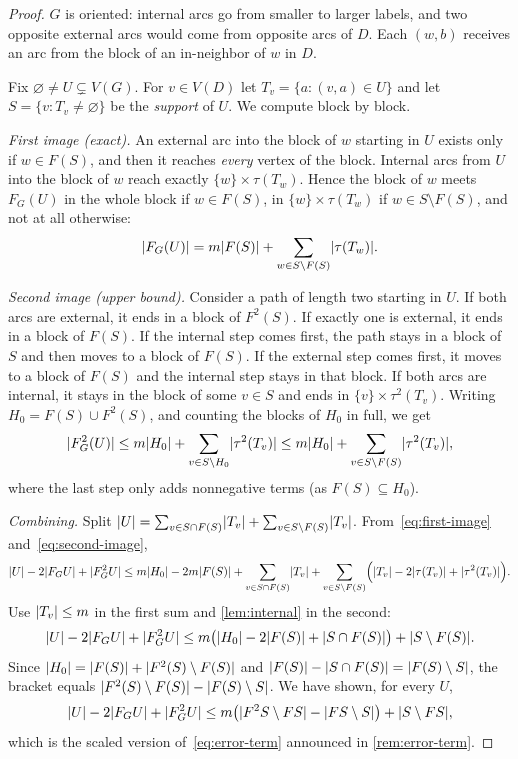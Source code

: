 \begin{proof}
$G$ is oriented: internal arcs go from smaller to larger labels, and two
opposite external arcs would come from opposite arcs of $D$. Each $(w,b)$
receives an arc from the block of an in-neighbor of $w$ in $D$.

Fix $\varnothing\ne U\subsetneq V(G)$. For $v\in V(D)$ let
$T_v=\{a:(v,a)\in U\}$ and let $S=\{v:T_v\ne\varnothing\}$ be the
\emph{support} of $U$. We compute block by block.

\emph{First image (exact).} An external arc into the block of $w$ starting
in $U$ exists only if $w\in F(S)$, and then it reaches \emph{every} vertex of
the block. Internal arcs from $U$ into the block of $w$ reach exactly
$\{w\}\times \tau(T_w)$. Hence the block of $w$ meets $F_G(U)$ in the whole block
if $w\in F(S)$, in $\{w\}\times \tau(T_w)$ if $w\in S\setminus F(S)$, and not at all
otherwise:
\begin{equation}\label{eq:first-image}
 \lvert F_G(U)\rvert=m\lvert F(S)\rvert+\sum_{w\in S\setminus F(S)}\lvert \tau(T_w)\rvert.
\end{equation}

\emph{Second image (upper bound).} Consider a path of length two starting in
$U$. If both arcs are external, it ends in a block of $F^2(S)$. If exactly
one is external, it ends in a block of $F(S)$. If the internal step comes
first, the path stays in a block of $S$ and then moves to a block of $F(S)$.
If the external step comes first, it moves to a block of $F(S)$ and the
internal step stays in that block. If
both arcs are internal, it stays in the block of some $v\in S$ and ends in
$\{v\}\times \tau^2(T_v)$. Writing $H_0=F(S)\cup F^2(S)$, and counting the blocks
of $H_0$ in full, we get
\begin{equation}\label{eq:second-image}
 \lvert F_G^2(U)\rvert\le m\lvert H_0\rvert+\sum_{v\in S\setminus H_0}\lvert \tau^2(T_v)\rvert
 \le m\lvert H_0\rvert+\sum_{v\in S\setminus F(S)}\lvert \tau^2(T_v)\rvert,
\end{equation}
where the last step only adds nonnegative terms (as $F(S)\subseteq H_0$).

\emph{Combining.} Split $\lvert U\rvert=\sum_{v\in S\cap F(S)}\lvert T_v\rvert+\sum_{v\in S\setminus F(S)}\lvert T_v\rvert$.
From~\eqref{eq:first-image} and~\eqref{eq:second-image},
\[
 \lvert U\rvert-2\lvert F_GU\rvert+\lvert F_G^2U\rvert
 \le m\lvert H_0\rvert-2m\lvert F(S)\rvert+\sum_{v\in S\cap F(S)}\lvert T_v\rvert
 +\sum_{v\in S\setminus F(S)}\Bigl(\lvert T_v\rvert-2\lvert \tau(T_v)\rvert+\lvert \tau^2(T_v)\rvert\Bigr).
\]
Use $\lvert T_v\rvert\le m$ in the first sum and \cref{lem:internal} in the second:
\[
 \lvert U\rvert-2\lvert F_GU\rvert+\lvert F_G^2U\rvert\le m\bigl(\lvert H_0\rvert-2\lvert F(S)\rvert+\lvert S\cap F(S)\rvert\bigr)+\lvert S\setminus F(S)\rvert.
\]
Since $\lvert H_0\rvert=\lvert F(S)\rvert+\lvert F^2(S)\setminus F(S)\rvert$ and
$\lvert F(S)\rvert-\lvert S\cap F(S)\rvert=\lvert F(S)\setminus S\rvert$, the bracket equals
$\lvert F^2(S)\setminus F(S)\rvert-\lvert F(S)\setminus S\rvert$. We have shown, for every
$U$,
\begin{equation}\label{eq:blowup-master}
 \lvert U\rvert-2\lvert F_GU\rvert+\lvert F_G^2U\rvert\le m\bigl(\lvert F^2S\setminus FS\rvert-\lvert FS\setminus S\rvert\bigr)+\lvert S\setminus FS\rvert,
\end{equation}
which is the scaled version of~\eqref{eq:error-term} announced in
\cref{rem:error-term}.


\end{proof}
